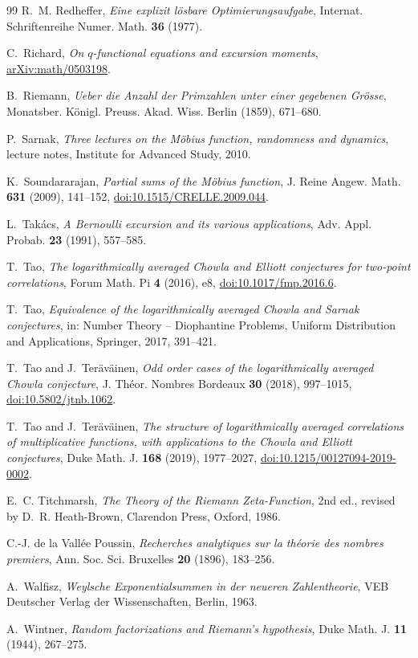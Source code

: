 \documentclass[11pt,reqno]{amsart}
\numberwithin{equation}{section}
\theoremstyle{plain}
\theoremstyle{definition}
\theoremstyle{remark}
\begin{document}
\begin{thebibliography}{99}
R.~M. Redheffer, \emph{Eine explizit l\"osbare Optimierungsaufgabe}, Internat.
Schriftenreihe Numer. Math. \textbf{36} (1977).

C.~Richard, \emph{On $q$-functional equations and excursion moments},
\href{https://arxiv.org/abs/math/0503198}{arXiv:math/0503198}.

B.~Riemann, \emph{Ueber die Anzahl der Primzahlen unter einer gegebenen
Gr\"osse}, Monatsber. K\"onigl. Preuss. Akad. Wiss. Berlin (1859), 671--680.

P.~Sarnak, \emph{Three lectures on the M\"obius function, randomness and
dynamics}, lecture notes, Institute for Advanced Study, 2010.

K.~Soundararajan, \emph{Partial sums of the M\"obius function}, J. Reine
Angew. Math. \textbf{631} (2009), 141--152,
\href{https://doi.org/10.1515/CRELLE.2009.044}{doi:10.1515/CRELLE.2009.044}.

L.~Tak\'acs, \emph{A Bernoulli excursion and its various applications},
Adv. Appl. Probab. \textbf{23} (1991), 557--585.

T.~Tao, \emph{The logarithmically averaged Chowla and Elliott conjectures for
two-point correlations}, Forum Math. Pi \textbf{4} (2016), e8,
\href{https://doi.org/10.1017/fmp.2016.6}{doi:10.1017/fmp.2016.6}.

T.~Tao, \emph{Equivalence of the logarithmically averaged Chowla and Sarnak
conjectures}, in: Number Theory -- Diophantine Problems, Uniform
Distribution and Applications, Springer, 2017, 391--421.

T.~Tao and J.~Ter\"av\"ainen, \emph{Odd order cases of the logarithmically
averaged Chowla conjecture}, J. Th\'eor. Nombres Bordeaux \textbf{30} (2018),
997--1015,
\href{https://doi.org/10.5802/jtnb.1062}{doi:10.5802/jtnb.1062}.

T.~Tao and J.~Ter\"av\"ainen, \emph{The structure of logarithmically averaged
correlations of multiplicative functions, with applications to the Chowla
and Elliott conjectures}, Duke Math. J. \textbf{168} (2019), 1977--2027,
\href{https://doi.org/10.1215/00127094-2019-0002}{doi:10.1215/00127094-2019-0002}.

E.~C. Titchmarsh, \emph{The Theory of the Riemann Zeta-Function}, 2nd ed.,
revised by D.~R. Heath-Brown, Clarendon Press, Oxford, 1986.

C.-J. de la Vall\'ee Poussin, \emph{Recherches analytiques sur la th\'eorie
des nombres premiers}, Ann. Soc. Sci. Bruxelles \textbf{20} (1896), 183--256.

A.~Walfisz, \emph{Weylsche Exponentialsummen in der neueren Zahlentheorie},
VEB Deutscher Verlag der Wissenschaften, Berlin, 1963.

A.~Wintner, \emph{Random factorizations and Riemann's hypothesis}, Duke
Math. J. \textbf{11} (1944), 267--275.

\end{thebibliography}
\end{document}
